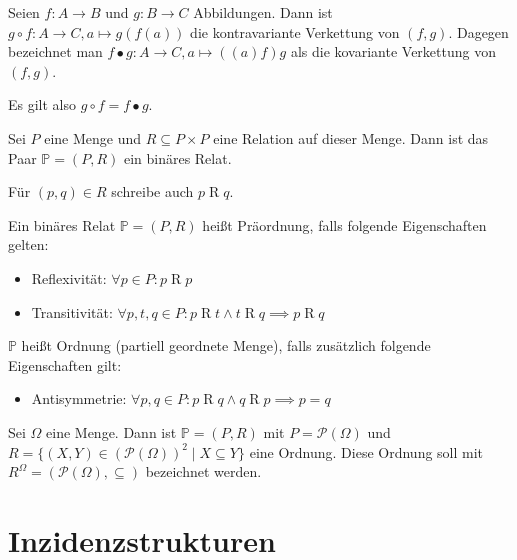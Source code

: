 \documentclass{article}
\begin{document}
\begin{definition}
  Seien $f \colon A \to B$ und $g \colon B \to C$ Abbildungen.
  Dann ist ${g \circ f \colon A \to C, a \mapsto g(f(a))}$ die kontravariante Verkettung von $(f, g)$. 
  Dagegen bezeichnet man $f \bullet g \colon A \to C, a \mapsto ((a)f)g$ als die kovariante Verkettung von $(f, g)$.

  Es gilt also $g \circ f = f \bullet g$.
\end{definition}

\begin{definition}
Sei $P$ eine Menge und $R \subseteq P \times P$ eine Relation auf dieser Menge.
Dann ist das Paar $\mathbb{P} = (P, R)$ ein binäres Relat.

Für $(p, q) \in R$ schreibe auch $p \mathrel{R} q$.
\end{definition}

\begin{definition}
  Ein binäres Relat $\mathbb{P} = (P, R)$ heißt Präordnung, falls folgende Eigenschaften gelten:
  \begin{itemize}
    \item Reflexivität: $\forall p \in P \colon p \mathrel{R} p$
    \item Transitivität: $\forall p, t, q \in P \colon p \mathrel{R} t \wedge t \mathrel{R} q \implies p \mathrel{R} q$
  \end{itemize}
  $\mathbb{P}$ heißt Ordnung (partiell geordnete Menge), falls zusätzlich folgende Eigenschaften gilt:
  \begin{itemize}
    \item Antisymmetrie: $\forall p, q \in P \colon p \mathrel{R} q \wedge q \mathrel{R} p \implies p = q$
  \end{itemize}
\end{definition}

  \begin{example}
    Sei $\Omega$ eine Menge. Dann ist $\mathbb{P} = (P, R)$ mit $P = \mathcal{P}(\Omega)$ und 
    $R = \{ (X, Y) \in (\mathcal{P}(\Omega))^2 \mid X \subseteq Y \}$ eine Ordnung.
    Diese Ordnung soll mit $R^\Omega = (\mathcal{P}(\Omega), \subseteq)$ bezeichnet werden.
  \end{example}

\newpage

\section{Inzidenzstrukturen}
\end{document}
